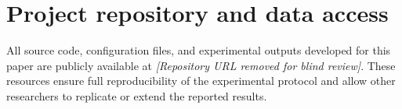 \documentclass[a4paper,fleqn]{cas-dc}
\begin{document}
\appendix

\section{Project repository and data access}\label{app:repo}

All source code, configuration files, and experimental outputs developed for
this paper are publicly available at
\textit{[Repository URL removed for blind review]}.
These resources ensure full reproducibility of the experimental protocol and
allow other researchers to replicate or extend the reported results.



\end{document}
